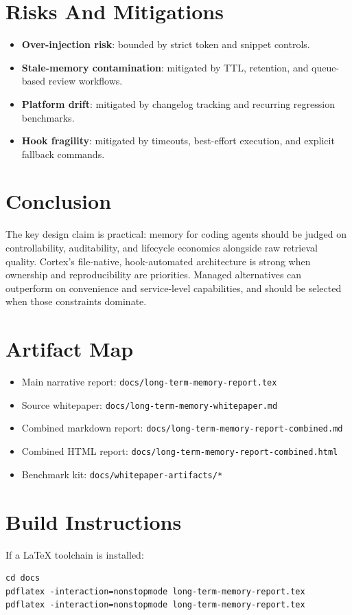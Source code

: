 \documentclass[11pt]{article}
\begin{document}
\section{Risks And Mitigations}
\begin{itemize}
  \item \textbf{Over-injection risk}: bounded by strict token and snippet controls.
  \item \textbf{Stale-memory contamination}: mitigated by TTL, retention, and queue-based review workflows.
  \item \textbf{Platform drift}: mitigated by changelog tracking and recurring regression benchmarks.
  \item \textbf{Hook fragility}: mitigated by timeouts, best-effort execution, and explicit fallback commands.
\end{itemize}

\section{Conclusion}
The key design claim is practical: memory for coding agents should be judged on controllability, auditability, and lifecycle economics alongside raw retrieval quality. Cortex's file-native, hook-automated architecture is strong when ownership and reproducibility are priorities. Managed alternatives can outperform on convenience and service-level capabilities, and should be selected when those constraints dominate.

\appendix
\section{Artifact Map}
\begin{itemize}
  \item Main narrative report: \texttt{docs/long-term-memory-report.tex}
  \item Source whitepaper: \texttt{docs/long-term-memory-whitepaper.md}
  \item Combined markdown report: \texttt{docs/long-term-memory-report-combined.md}
  \item Combined HTML report: \texttt{docs/long-term-memory-report-combined.html}
  \item Benchmark kit: \texttt{docs/whitepaper-artifacts/*}
\end{itemize}

\section{Build Instructions}
If a LaTeX toolchain is installed:
\begin{verbatim}
cd docs
pdflatex -interaction=nonstopmode long-term-memory-report.tex
pdflatex -interaction=nonstopmode long-term-memory-report.tex
\end{verbatim}
\end{document}
